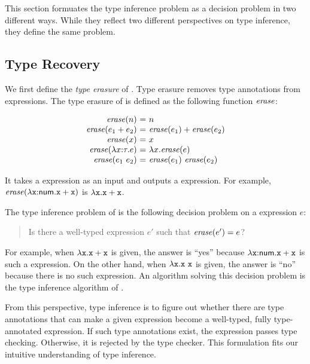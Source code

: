 This section formuates the type inference problem as a decision problem in two
different ways. While they reflect two different perspectives on type
inference, they define the same problem.

\subsection{Type Recovery}

\newcommand{\ersr}[1]{\embox{erase}(#1)}

We first define the \textit{type erasure} of \plang. Type
erasure removes type annotations from expressions. The type erasure of \plang is
defined as the following function $\mbox{\emph{erase}}$:

\[
  \begin{array}{r@{~}c@{~}l}
    \ersr{n} &=& n \\
    \ersr{\eadd{e_1}{e_2}} &=& \eadd{\ersr{e_1}}{\ersr{e_2}} \\
    \ersr{x} &=& x \\
    \ersr{\efunt{x}{\tau}{e}} &=& \efun{x}{\ersr{e}} \\
    \ersr{\eapp{e_1}{e_2}} &=& \eapp{\ersr{e_1}}{\ersr{e_2}} \\
  \end{array}
\]

It takes a \plang expression as an input and outputs a \lang expression.
For example, $\ersr{\efunt{\cx}{\tnum}{\eadd{\cx}{\cx}}}$ is
$\lambda\texttt{x}.\texttt{x}+\texttt{x}$.

The type inference problem of \lang is the following decision problem on a \lang
expression $e$:

\begin{quote}
  \hspace{-1em}Is there a well-typed \plang expression $e'$ such that $\ersr{e'}=e$?
\end{quote}

For example, when $\lambda\texttt{x}.\texttt{x}+\texttt{x}$ is given, the answer is ``yes''
because $\lambda\texttt{x}{:}\textsf{num}.\texttt{x}+\texttt{x}$ is such a \plang expression. On
the other hand, when $\lambda\texttt{x}.\texttt{x}\ \texttt{x}$ is given, the answer is
``no'' because there is no such expression. An algorithm solving this decision
problem is the type inference algorithm of \lang.

From this perspective, type inference is to figure out whether there are type
annotations that can make a given expression become a well-typed, fully
type-annotated expression. If such type annotations exist, the expression passes
type checking. Otherwise, it is rejected by the type checker. This formulation
fits our intuitive understanding of type inference.

